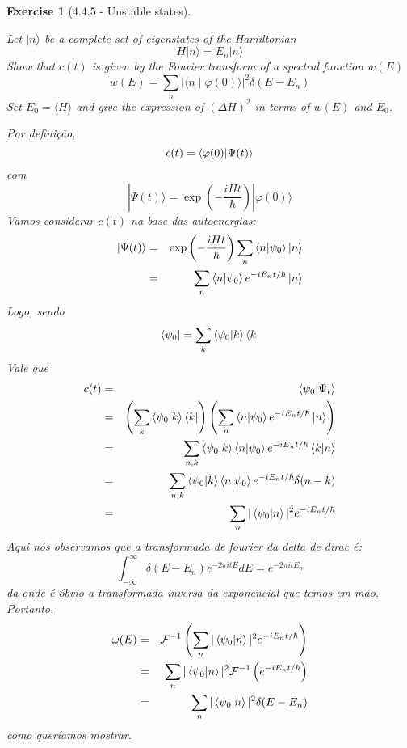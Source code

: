 \documentclass[12pt]{article}
\def\be{\begin{equation}}
\def\ee{\end{equation}}
\def\bea{\begin{eqnarray*}}
\def\eea{\end{eqnarray*}}
\def\l{\left}
\def\r{\right}
\newtheorem{exercise}{Exercise}
\begin{document}
\begin{exercise}[4.4.5 - Unstable states]
\begin{exercises}
			\item Let $|n\rangle$ be a complete set of eigenstates of the Hamiltonian
			$$
			H|n\rangle=E_{n}|n\rangle
			$$
			Show that $c(t)$ is given by the Fourier transform of a spectral function $w(E)$
			$$
			w(E)=\sum_{n}|\langle n \mid \varphi(0)\rangle|^{2} \delta\left(E-E_{n}\right)
			$$
			Set $E_{0}=\langle H\rangle$ and give the expression of $(\Delta H)^{2}$ in terms of $w(E)$ and $E_{0}$.
			\begin{multianswer}
				Por definição,
				\be
					c(t)=\braket{\varphi(0) | \Psi(t)}
				\ee
				com
				\be
					|\Psi(t)\rangle=\exp\left(-\frac{i H t}{\hbar}\right)|\varphi(0)\rangle
				\ee
				Vamos considerar $c(t)$ na base das autoenergias:
				\bea
					\ket{\Psi(t)} &=& \exp\left(-\frac{i H t}{\hbar}\right) \sum_{n} \braket{n|\psi_0}\ket{n} \\
						&=& \sum_n \braket{n|\psi_0} e^{-iE_nt/\hbar} \ket{n}
				\eea
				Logo, sendo 
				\be
					\bra{\psi_0} = \sum_k \braket{\psi_0|k}\bra{k}
				\ee
				Vale que
				\bea
					c(t) &=& \braket{\psi_0|\Psi_t} \\
						&=& \l(\sum_k \braket{\psi_0|k}\bra{k}\r)\l( \sum_n \braket{n|\psi_0} e^{-iE_nt/\hbar} \ket{n}\r) \\
						&=& \sum_{n, k} \braket{\psi_0|k} \braket{n|\psi_0} e^{-iE_nt/\hbar} \braket{k|n} \\
						&=& \sum_{n, k} \braket{\psi_0|k} \braket{n|\psi_0} e^{-iE_nt/\hbar} \delta(n-k) \\
						&=& \sum_n |\braket{\psi_0|n}|^2e^{-iE_nt/\hbar}
				\eea
				Aqui nós observamos que a transformada de fourier da delta de dirac é:
				\be
					\int_{-\infty}^{\infty} \delta(E-E_n) e^{-2\pi i tE} dE = e^{-2\pi i tE_n}
				\ee
				da onde é óbvio a transformada inversa da exponencial que temos em mão. Portanto,
				\bea
				\omega(E) &=& \mathcal{F}^{-1} \l( \sum_n |\braket{\psi_0|n}|^ 2e^{-iE_nt/\hbar}\r) \\
					&=&  \sum_n |\braket{\psi_0|n}|^2 \mathcal{F}^{-1}\l(e^{-iE_nt/\hbar}\r) \\
					&=& \sum_n |\braket{\psi_0|n}|^2 \delta(E-E_n)
				\eea
				como queríamos mostrar. 
				
			\end{multianswer}
		

\end{exercises}
\end{exercise}
\end{document}
